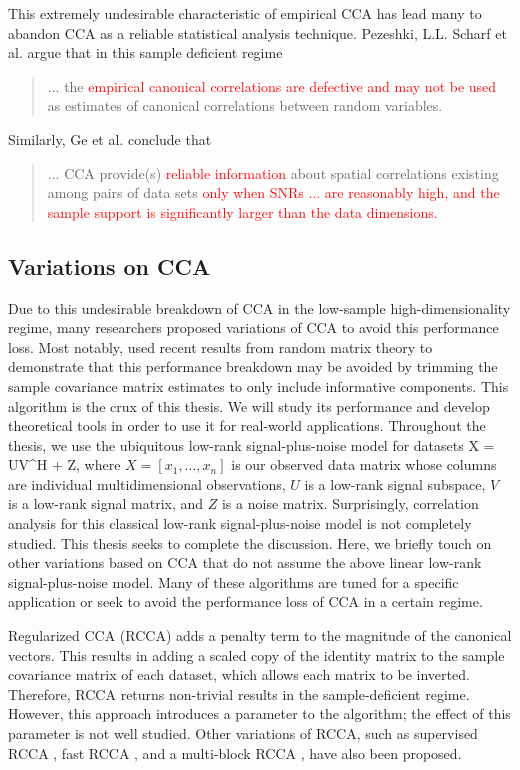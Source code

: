 This extremely undesirable characteristic of empirical CCA has lead many to abandon CCA as
a reliable statistical analysis technique. Pezeshki, L.L. Scharf et al. argue that in this
sample deficient regime
\begin{quote}
  ... the \textcolor{red}{empirical canonical correlations are defective and
    may not be used} as     estimates of canonical correlations between random
  variables.\cite{pezeshki2004empirical}
\end{quote}
Similarly, Ge et al. conclude that
\begin{quote}
... CCA provide(s) \textcolor{red}{reliable information} about spatial
    correlations existing among pairs of data sets \textcolor{red}{only when SNRs ... are
    reasonably high, and the sample support is significantly larger than the data
    dimensions.}\cite{ge2009does}
\end{quote}



\subsection{Variations on CCA}

Due to this undesirable breakdown of CCA in the low-sample high-dimensionality regime,
many researchers proposed variations of CCA to avoid this performance loss. Most notably,
\cite{nadakuditi2011fundamental} used recent results from random matrix theory to
demonstrate that this performance breakdown may be avoided by trimming the sample
covariance matrix estimates to only include informative components. This algorithm is the
crux of this thesis. We will study its performance and develop theoretical tools in order
to use it for real-world applications. Throughout the thesis, we use the ubiquitous
low-rank signal-plus-noise model for datasets \be X = UV^H + Z, \ee where
$X=[x_1,\dots,x_n]$ is our observed data matrix whose columns are individual
multidimensional observations, $U$ is a low-rank signal subspace, $V$ is a low-rank signal
matrix, and $Z$ is a noise matrix. Surprisingly, correlation analysis for this classical
low-rank signal-plus-noise model is not completely studied. This thesis seeks to complete
the discussion. Here, we briefly touch on other variations based on CCA that do not assume
the above linear low-rank signal-plus-noise model. Many of these algorithms are tuned for
a specific application or seek to avoid the performance loss of CCA in a certain regime.

Regularized CCA (RCCA) \cite{vinod1976canonical} adds a penalty term to the magnitude of
the canonical vectors. This results in adding a scaled copy of the identity matrix to the
sample covariance matrix of each dataset, which allows each matrix to be
inverted. Therefore, RCCA returns non-trivial results in the sample-deficient
regime. However, this approach introduces a parameter to the algorithm; the effect of this
parameter is not well studied. Other variations of RCCA, such as supervised
RCCA \cite{thum2014supervised}, fast RCCA \cite{cruz2014fast}, and a multi-block RCCA
\cite{tenenhaus2014regularized}, have also been proposed.


